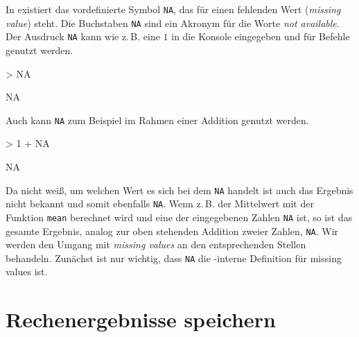 In \R{} existiert das vordefinierte Symbol \verb!NA!, das für einen fehlenden Wert (\emph{missing value}) steht. Die Buchstaben \verb!NA! sind ein Akronym für die Worte \emph{not available}. Der Ausdruck \texttt{NA} kann wie z.\,B. eine $1$ in die Konsole eingegeben und für \R{} Befehle genutzt werden. 

\begin{Schunk}
\begin{Sinput}
> NA
\end{Sinput}
\begin{Soutput}
[1] NA
\end{Soutput}
\end{Schunk}

Auch kann \texttt{NA} zum Beispiel im Rahmen einer Addition genutzt werden.

\begin{Schunk}
\begin{Sinput}
> 1 + NA
\end{Sinput}
\begin{Soutput}
[1] NA
\end{Soutput}
\end{Schunk}

Da \R{} nicht weiß, um welchen Wert es sich bei dem \texttt{NA} handelt ist auch das Ergebnis nicht bekannt und somit ebenfalls \texttt{NA}. Wenn z.\,B. der Mittelwert mit der Funktion \texttt{mean} berechnet wird und eine der eingegebenen Zahlen \texttt{NA} ist, so ist das gesamte Ergebnis, analog zur oben stehenden Addition zweier Zahlen, \texttt{NA}. Wir werden den Umgang mit \emph{missing values} an den entsprechenden Stellen behandeln. Zunächst ist nur wichtig, dass \texttt{NA} die \R{}-interne Definition für missing values ist.



\section{Rechenergebnisse speichern}

